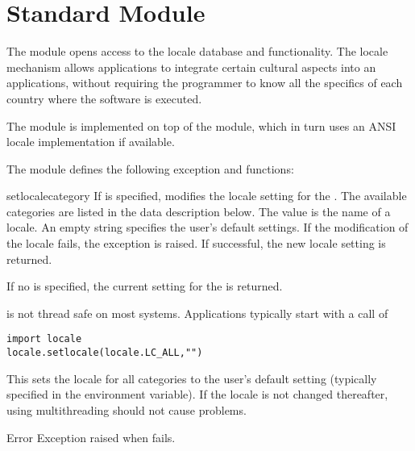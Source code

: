 \section{Standard Module }




The  module opens access to the \POSIX{} locale database
and functionality. The \POSIX{} locale mechanism allows applications
to integrate certain cultural aspects into an applications, without
requiring the programmer to know all the specifics of each country
where the software is executed.

The  module is implemented on top of the
 module, which in turn uses an
ANSI \C{} locale implementation if available.

The  module defines the following exception and
functions:


\begin{funcdesc}{setlocale}{category}
If  is specified, modifies the locale setting for the
. The available categories are listed in the data
description below. The value is the name of a locale. An empty string
specifies the user's default settings. If the modification of the
locale fails, the exception  is
raised. If successful, the new locale setting is returned.

If no  is specified, the current setting for the
 is returned.

 is not thread safe on most systems. Applications
typically start with a call of
\begin{verbatim}
import locale
locale.setlocale(locale.LC_ALL,"")
\end{verbatim}
This sets the locale for all categories to the user's default setting
(typically specified in the  environment variable). If the
locale is not changed thereafter, using multithreading should not
cause problems.
\end{funcdesc}

\begin{excdesc}{Error}
Exception raised when  fails.
\end{excdesc}

